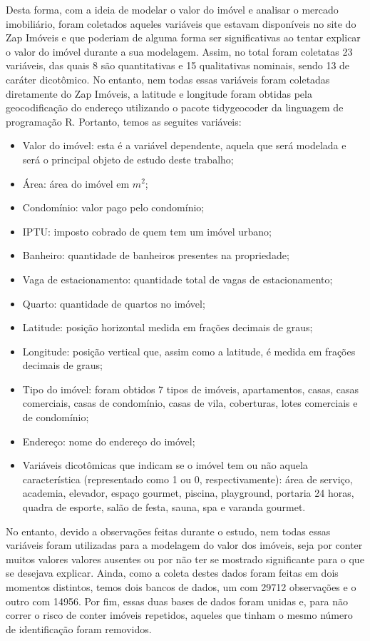 \documentclass[
  letterpaper,
  DIV=11,
  numbers=noendperiod]{scrreprt}
\begin{document}
Desta forma, com a ideia de modelar o valor do imóvel e analisar o
mercado imobiliário, foram coletados aqueles variáveis que estavam
disponíveis no site do Zap Imóveis e que poderiam de alguma forma ser
significativas ao tentar explicar o valor do imóvel durante a sua
modelagem. Assim, no total foram coletatas 23 variáveis, das quais 8 são
quantitativas e 15 qualitativas nominais, sendo 13 de caráter
dicotômico. No entanto, nem todas essas variáveis foram coletadas
diretamente do Zap Imóveis, a latitude e longitude foram obtidas pela
geocodificação do endereço utilizando o pacote tidygeocoder da linguagem
de programação R. Portanto, temos as seguites variáveis:

\begin{itemize}
\item
  Valor do imóvel: esta é a variável dependente, aquela que será
  modelada e será o principal objeto de estudo deste trabalho;
\item
  Área: área do imóvel em \(m^2\);
\item
  Condomínio: valor pago pelo condomínio;
\item
  IPTU: imposto cobrado de quem tem um imóvel urbano;
\item
  Banheiro: quantidade de banheiros presentes na propriedade;
\item
  Vaga de estacionamento: quantidade total de vagas de estacionamento;
\item
  Quarto: quantidade de quartos no imóvel;
\item
  Latitude: posição horizontal medida em frações decimais de graus;
\item
  Longitude: posição vertical que, assim como a latitude, é medida em
  frações decimais de graus;
\item
  Tipo do imóvel: foram obtidos 7 tipos de imóveis, apartamentos, casas,
  casas comerciais, casas de condomínio, casas de vila, coberturas,
  lotes comerciais e de condomínio;
\item
  Endereço: nome do endereço do imóvel;
\item
  Variáveis dicotômicas que indicam se o imóvel tem ou não aquela
  característica (representado como 1 ou 0, respectivamente): área de
  serviço, academia, elevador, espaço gourmet, piscina, playground,
  portaria 24 horas, quadra de esporte, salão de festa, sauna, spa e
  varanda gourmet.
\end{itemize}

No entanto, devido a observações feitas durante o estudo, nem todas
essas variáveis foram utilizadas para a modelagem do valor dos imóveis,
seja por conter muitos valores valores ausentes ou por não ter se
mostrado significante para o que se desejava explicar. Ainda, como a
coleta destes dados foram feitas em dois momentos distintos, temos dois
bancos de dados, um com 29712 observações e o outro com 14956. Por fim,
essas duas bases de dados foram unidas e, para não correr o risco de
conter imóveis repetidos, aqueles que tinham o mesmo número de
identificação foram removidos.
\end{document}
